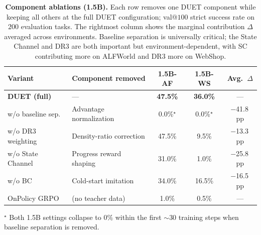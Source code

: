 
\begin{table}[t]
\centering
\caption{\textbf{Component ablations (1.5B).} Each row removes one DUET component while keeping all others at the full DUET configuration; val@$100$ strict success rate on $200$ evaluation tasks. The rightmost column shows the marginal contribution $\Delta$ averaged across environments. Baseline separation is universally critical; the State Channel and DR3 are both important but environment-dependent, with SC contributing more on ALFWorld and DR3 more on WebShop.}
\label{tab:ablation}
\setlength{\tabcolsep}{3pt}
\renewcommand{\arraystretch}{1.02}
\begin{tabular}{llccc}
\toprule
\textbf{Variant} & \textbf{Component removed} & \textbf{1.5B-AF} & \textbf{1.5B-WS} & \textbf{Avg.\ $\Delta$} \\
\midrule
\rowcolor{gray!12}
\textbf{DUET (full)}    & ---                       & \textbf{47.5\%}          & \textbf{36.0\%}          & ---          \\
\midrule
w/o baseline sep.\ & Advantage normalization    & \phantom{0}0.0\%$^\star$ & \phantom{0}0.0\%$^\star$ & $-$41.8\,pp  \\
w/o DR3 weighting  & Density-ratio correction   & 47.5\%                   & \phantom{0}9.5\%         & $-$13.3\,pp  \\
w/o State Channel  & Progress reward shaping    & 31.0\%                   & \phantom{0}1.0\%         & $-$25.8\,pp  \\
w/o BC             & Cold-start imitation       & 34.0\%                   & 16.5\%                   & $-$16.5\,pp  \\
\midrule
OnPolicy GRPO      & (no teacher data)          & \phantom{0}1.0\%         & \phantom{0}0.5\%         & ---          \\
\bottomrule
\end{tabular}
\vspace{2pt}

\raggedright
\footnotesize
$^\star$ Both 1.5B settings collapse to $0\%$ within the first $\sim 30$ training steps when baseline separation is removed.
\end{table}
